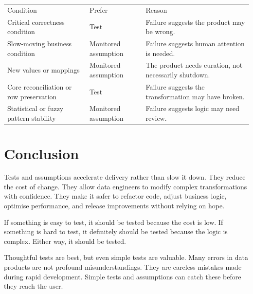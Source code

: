 \documentclass[10pt,openany,10pt]{book}
\newcounter{none}
\let\podeToprule\toprule
\let\podeMidrule\midrule
\let\podeBottomrule\bottomrule
\renewcommand{\toprule}{\arrayrulecolor{pbiGrid}\podeToprule}
\renewcommand{\midrule}{\arrayrulecolor{pbiGrid}\podeMidrule}
\renewcommand{\bottomrule}{\arrayrulecolor{pbiGrid}\podeBottomrule}
\begin{document}
{\def\LTcaptype{none} %
\begin{longtable}[]{@{}
  >{\raggedright\arraybackslash}p{}
  >{\raggedright\arraybackslash}p{}
  >{\raggedright\arraybackslash}p{}@{}}
\toprule\noalign{}
\begin{minipage}[b]{\linewidth}\raggedright
Condition
\end{minipage} & \begin{minipage}[b]{\linewidth}\raggedright
Prefer
\end{minipage} & \begin{minipage}[b]{\linewidth}\raggedright
Reason
\end{minipage} \\
\midrule\noalign{}
\endhead
\bottomrule\noalign{}
\endlastfoot
Critical correctness condition & Test & Failure suggests the product may
be wrong. \\
Slow-moving business condition & Monitored assumption & Failure suggests
human attention is needed. \\
New values or mappings & Monitored assumption & The product needs
curation, not necessarily shutdown. \\
Core reconciliation or row preservation & Test & Failure suggests the
transformation may have broken. \\
Statistical or fuzzy pattern stability & Monitored assumption & Failure
suggests logic may need review. \\
\end{longtable}
}

\section{Conclusion}\label{conclusion-2}

Tests and assumptions accelerate delivery rather than slow it down. They
reduce the cost of change. They allow data engineers to modify complex
transformations with confidence. They make it safer to refactor code,
adjust business logic, optimise performance, and release improvements
without relying on hope.

If something is easy to test, it should be tested because the cost is
low. If something is hard to test, it definitely should be tested
because the logic is complex. Either way, it should be tested.

Thoughtful tests are best, but even simple tests are valuable. Many
errors in data products are not profound misunderstandings. They are
careless mistakes made during rapid development. Simple tests and
assumptions can catch these before they reach the user.
\end{document}
